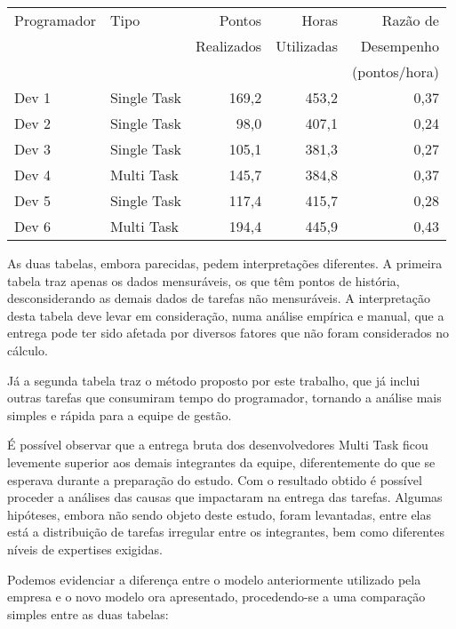 \begin{center}
\begin{tabular}{ | l | l | r | r | r | } 
 \hline
 Programador & Tipo & Pontos & Horas & Razão de \\ 
 & & Realizados & Utilizadas & Desempenho \\ 
 & & & & (pontos/hora) \\ \hline
 Dev 1 & Single Task & 169,2 & 453,2 & 0,37 \\
 Dev 2 & Single Task & 98,0  & 407,1 & 0,24 \\
 Dev 3 & Single Task & 105,1 & 381,3 & 0,27 \\
 Dev 4 & Multi Task  & 145,7 & 384,8 & 0,37 \\
 Dev 5 & Single Task & 117,4 & 415,7 & 0,28 \\
 Dev 6 & Multi Task  & 194,4 & 445,9 & 0,43  \\
 \hline
\end{tabular}
\end{center}

As duas tabelas, embora parecidas, pedem interpretações diferentes. A primeira tabela traz apenas os dados mensuráveis, os que têm pontos de história, desconsiderando as demais dados de tarefas não mensuráveis. A interpretação desta tabela deve levar em consideração, numa análise empírica e manual, que a entrega pode ter sido afetada por diversos fatores que não foram considerados no cálculo.\par
Já a segunda tabela traz o método proposto por este trabalho, que já inclui outras tarefas que consumiram tempo do programador, tornando a análise mais simples e rápida para a equipe de gestão. \par 
É possível observar que a entrega bruta dos desenvolvedores Multi Task ficou levemente superior aos demais integrantes da equipe, diferentemente do que se esperava durante a preparação do estudo. Com o resultado obtido é possível proceder a análises das causas que impactaram na entrega das tarefas. Algumas hipóteses, embora não sendo objeto deste estudo, foram levantadas, entre elas está a distribuição de tarefas irregular entre os integrantes, bem como diferentes níveis de expertises exigidas.\par

Podemos evidenciar a diferença entre o modelo anteriormente utilizado pela empresa e o novo modelo ora apresentado, procedendo-se a uma comparação simples entre as duas tabelas:

